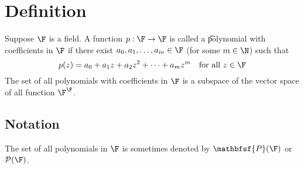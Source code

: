 
\section*{Definition}

Suppose $\F $ is a field.
A function $p: \F  \to \F $ is called a \t{polynomial} with coefficients in $\F $ if there exist $a_0, a_1, \dots , a_m \in \F $ (for some $m \in \N  $) such that
\[
p(z) = a_0 + a_1z + a_2z^2 + \cdots + a_mz^m \quad \text{for all } z \in \F
\]
The set of all polynomials with coefficients in $\F $ is a subspace of the vector space of all function $\F ^\F $.

\subsection*{Notation}

The set of all polynomials in $\F $ is sometimes denoted by $\mathbfsf{P} (\F )$ or $\mathcal{P} (\F )$.

\blankpage